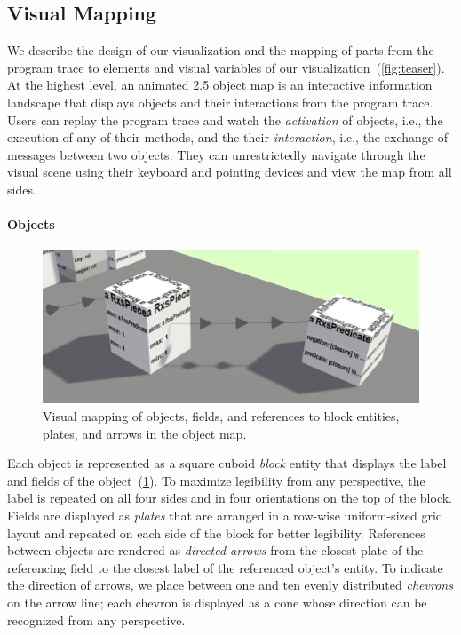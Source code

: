 \subsection{Visual Mapping}
\label{sec:visualization_approach/mapping}

We describe the design of our visualization and the mapping of parts from the program trace to elements and visual variables of our visualization~(\cref{fig:teaser}).
At the highest level, an animated 2.5 object map is an interactive information landscape that displays objects and their interactions from the program trace.
Users can replay the program trace and watch the \emph{activation} of objects, i.e., the execution of any of their methods, and the their \emph{interaction}, i.e., the exchange of messages between two objects.
They can unrestrictedly navigate through the visual scene using their keyboard and pointing devices and view the map from all sides.

\paragraph{Objects}
\label{sec:visualization_approach/mapping/objects}

\begin{figure}[b!]
	\includegraphics[width=\linewidth]{sections/03_visualization_approach/mapping/objects}
	\caption{Visual mapping of objects, fields, and references to block entities, plates, and arrows in the object map.}
	\label{fig:visualization_approach/mapping/objects}
\end{figure}

Each object is represented as a square cuboid \emph{block} entity that displays the label and fields of the object~(\cref{fig:visualization_approach/mapping/objects}).
To maximize legibility from any perspective, the label is repeated on all four sides and in four orientations on the top of the block.
Fields are displayed as \emph{plates} that are arranged in a row-wise uniform-sized grid layout and repeated on each side of the block for better legibility.
References between objects are rendered as \emph{directed arrows} from the closest plate of the referencing field to the closest label of the referenced object's entity.
To indicate the direction of arrows, we place between one and ten evenly distributed \emph{chevrons} on the arrow line; each chevron is displayed as a cone whose direction can be recognized from any perspective.

